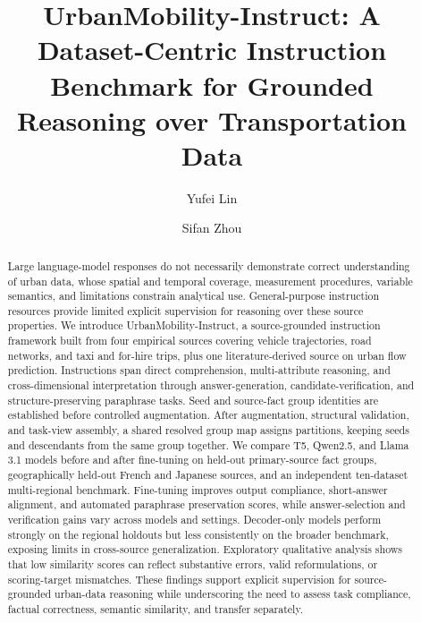 \documentclass[a4paper,fleqn]{cas-sc}
\begin{document}

\title[mode=title]{UrbanMobility-Instruct: A Dataset-Centric Instruction Benchmark for Grounded Reasoning over Transportation Data}

\author[1]{Yufei Lin}
\cormark[1]

\author[2]{Sifan Zhou}



\begin{abstract}
Large language-model responses do not necessarily demonstrate correct understanding of urban data, whose spatial and temporal coverage, measurement procedures, variable semantics, and limitations constrain analytical use. General-purpose instruction resources provide limited explicit supervision for reasoning over these source properties. We introduce UrbanMobility-Instruct, a source-grounded instruction framework built from four empirical sources covering vehicle trajectories, road networks, and taxi and for-hire trips, plus one literature-derived source on urban flow prediction. Instructions span direct comprehension, multi-attribute reasoning, and cross-dimensional interpretation through answer-generation, candidate-verification, and structure-preserving paraphrase tasks. Seed and source-fact group identities are established before controlled augmentation. After augmentation, structural validation, and task-view assembly, a shared resolved group map assigns partitions, keeping seeds and descendants from the same group together. We compare T5, Qwen2.5, and Llama 3.1 models before and after fine-tuning on held-out primary-source fact groups, geographically held-out French and Japanese sources, and an independent ten-dataset multi-regional benchmark. Fine-tuning improves output compliance, short-answer alignment, and automated paraphrase preservation scores, while answer-selection and verification gains vary across models and settings. Decoder-only models perform strongly on the regional holdouts but less consistently on the broader benchmark, exposing limits in cross-source generalization. Exploratory qualitative analysis shows that low similarity scores can reflect substantive errors, valid reformulations, or scoring-target mismatches. These findings support explicit supervision for source-grounded urban-data reasoning while underscoring the need to assess task compliance, factual correctness, semantic similarity, and transfer separately.
\end{abstract}
\end{document}
